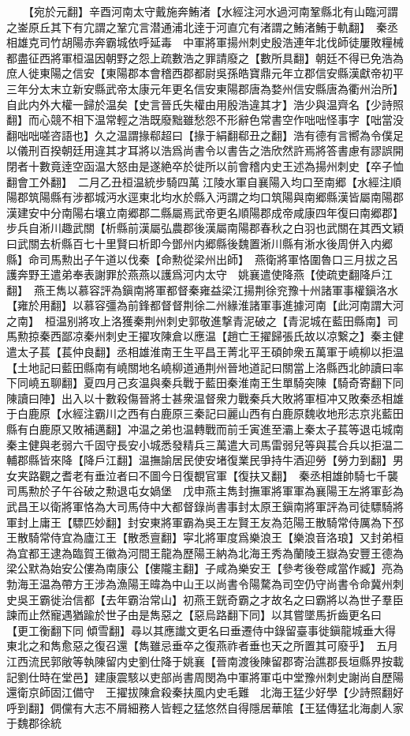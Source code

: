 　　【宛於元翻】辛酉河南太守戴施奔鮪渚【水經注河水過河南鞏縣北有山臨河謂之崟原丘其下有宂謂之鞏宂言潜通浦北逹于河直宂有渚謂之鮪渚鮪于軌翻】　秦丞相雄克司竹胡陽赤奔霸城依呼延毒　中軍將軍揚州刺史殷浩連年北伐師徒屢敗糧械都盡征西將軍桓温因朝野之怨上疏數浩之罪請廢之【數所具翻】朝廷不得已免浩為庶人徙東陽之信安【東陽郡本會稽西郡都尉吳孫皓寶鼎元年立郡信安縣漢獻帝初平三年分太末立新安縣武帝太康元年更名信安東陽郡唐為婺州信安縣唐為衢州治所】自此内外大權一歸於温矣【史言晉氏失權由用殷浩違其才】浩少與温齊名【少詩照翻】而心競不相下温常輕之浩既廢黜雖愁怨不形辭色常書空作咄咄怪事字【咄當没翻咄咄嗟咨語也】久之温謂掾郗超曰【掾于絹翻郗丑之翻】浩有德有言嚮為令僕足以儀刑百揆朝廷用違其才耳將以浩爲尚書令以書告之浩欣然許焉將答書慮有謬誤開閉者十數竟逹空函温大怒由是遂絶卒於徙所以前會稽内史王述為揚州刺史【卒子恤翻會工外翻】　二月乙丑桓温統步騎四萬江陵水軍自襄陽入均口至南郷【水經注順陽郡筑陽縣有涉都城沔水逕東北均水於縣入沔謂之均口筑陽與南郷縣漢皆屬南陽郡漢建安中分南陽右壤立南郷郡二縣屬焉武帝更名順陽郡成帝咸康四年復曰南郷郡】步兵自淅川趣武關【析縣前漢屬弘農郡後漢屬南陽郡春秋之白羽也武關在其西文穎曰武關去析縣百七十里賢曰析即今鄧州内郷縣後魏置淅川縣有淅水後周併入内郷縣】命司馬勲出子午道以伐秦【命勲從梁州出師】　燕衛將軍恪圍魯口三月拔之呂護奔野王遣弟奉表謝罪於燕燕以護爲河内太守　姚襄遣使降燕【使疏吏翻降戶江翻】　燕王雋以慕容評為鎭南將軍都督秦雍益梁江揚荆徐兖豫十州諸軍事權鎭洛水【雍於用翻】以慕容彊為前鋒都督督荆徐二州緣淮諸軍事進據河南【此河南謂大河之南】　桓温别將攻上洛獲秦荆州刺史郭敬進撃青泥破之【青泥城在藍田縣南】司馬勲掠秦西鄙凉秦州刺史王擢攻陳倉以應温【趙亡王擢歸張氏故以凉繋之】秦主健遣太子萇【萇仲良翻】丞相雄淮南王生平昌王菁北平王碩帥衆五萬軍于嶢柳以拒温【土地記曰藍田縣南有嶢關地名嶢柳道通荆州晉地道記曰關當上洛縣西北帥讀曰率下同嶢五聊翻】夏四月己亥温與秦兵戰于藍田秦淮南王生單騎突陳【騎奇寄翻下同陳讀曰陣】出入以十數殺傷晉將士甚衆温督衆力戰秦兵大敗將軍桓冲又敗秦丞相雄于白鹿原【水經注霸川之西有白鹿原三秦記曰麗山西有白鹿原魏收地形志京兆藍田縣有白鹿原又敗補邁翻】冲温之弟也温轉戰而前壬寅進至灞上秦太子萇等退屯城南秦主健與老弱六千固守長安小城悉發精兵三萬遣大司馬雷弱兒等與萇合兵以拒温二輔郡縣皆來降【降戶江翻】温撫諭居民使安堵復業民爭持牛酒迎勞【勞力到翻】男女夹路觀之耆老有垂泣者曰不圖今日復覩官軍【復扶又翻】　秦丞相雄帥騎七千襲司馬勲於子午谷破之勲退屯女媧堡　戊申燕主雋封撫軍將軍軍為襄陽王左將軍彭為武昌王以衛將軍恪為大司馬侍中大都督錄尚書事封太原王鎭南將軍評為司徒驃騎將軍封上庸王【驃匹妙翻】封安東將軍霸為吳王左賢王友為范陽王散騎常侍厲為下邳王散騎常侍宜為廬江王【散悉亶翻】寜北將軍度爲樂浪王【樂浪音洛琅】又封弟桓為宜都王逮為臨賀王徽為河間王龍為歷陽王納為北海王秀為蘭陵王嶽為安豐王德為梁公默為始安公僂為南康公【僂隴主翻】子咸為樂安王【參考後卷咸當作臧】亮為勃海王温為帶方王涉為漁陽王暐為中山王以尚書令陽騖為司空仍守尚書令命冀州刺史吳王霸徙治信都【去年霸治常山】初燕王皝奇霸之才故名之曰霸將以為世子羣臣諫而止然寵遇猶踰於世子由是雋惡之【惡烏路翻下同】以其嘗墜馬折齒更名曰【更工衡翻下同傾雪翻】尋以其應䜟文更名曰垂遷侍中錄留臺事徙鎭龍城垂大得東北之和雋愈惡之復召還【雋雖忌垂卒之復燕祚者垂也天之所置其可廢乎】　五月江西流民郭敞等執陳留内史劉仕降于姚襄【晉南渡後陳留郡寄治譙郡長垣縣界按載記劉仕時在堂邑】建康震駭以吏部尚書周閔為中軍將軍屯中堂豫州刺史謝尚自歷陽還衛京師固江備守　王擢拔陳倉殺秦扶風内史毛難　北海王猛少好學【少詩照翻好呼到翻】倜儻有大志不屑細務人皆輕之猛悠然自得隱居華隂【王猛傳猛北海劇人家于魏郡徐統